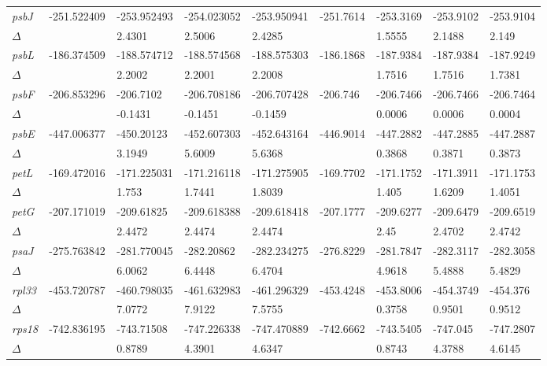 \documentclass[a4paper]{article}
\begin{document}
\begin{longtable}{p{0.03\linewidth}|p{0.095\linewidth}p{0.095\linewidth}p{0.095\linewidth}p{0.095\linewidth}|p{0.095\linewidth}p{0.095\linewidth}p{0.095\linewidth}p{0.095\linewidth}}
 \rowcolor{black!20} \textit{psbJ} & -251.522409 & -253.952493 & -254.023052 & -253.950941 & -251.7614 & -253.3169 & -253.9102 & -253.9104\\
 \rowcolor{black!20} $\Delta$ &  & 2.4301 & 2.5006 & 2.4285 &  & 1.5555 & 2.1488 & 2.149\\
\textit{psbL} & -186.374509 & -188.574712 & -188.574568 & -188.575303 & -186.1868 & -187.9384 & -187.9384 & -187.9249\\
$\Delta$ &  & 2.2002 & 2.2001 & 2.2008 &  & 1.7516 & 1.7516 & 1.7381\\
 \rowcolor{black!20} \textit{psbF} & -206.853296 & -206.7102 & -206.708186 & -206.707428 & -206.746 & -206.7466 & -206.7466 & -206.7464\\
 \rowcolor{black!20} $\Delta$ &  & -0.1431 & -0.1451 & -0.1459 &  & 0.0006 & 0.0006 & 0.0004\\
\textit{psbE} & -447.006377 & -450.20123 & -452.607303 & -452.643164 & -446.9014 & -447.2882 & -447.2885 & -447.2887\\
$\Delta$ &  & 3.1949 & 5.6009 & 5.6368 &  & 0.3868 & 0.3871 & 0.3873\\
 \rowcolor{black!20} \textit{petL} & -169.472016 & -171.225031 & -171.216118 & -171.275905 & -169.7702 & -171.1752 & -171.3911 & -171.1753\\
 \rowcolor{black!20} $\Delta$ &  & 1.753 & 1.7441 & 1.8039 &  & 1.405 & 1.6209 & 1.4051\\
\textit{petG} & -207.171019 & -209.61825 & -209.618388 & -209.618418 & -207.1777 & -209.6277 & -209.6479 & -209.6519\\
$\Delta$ &  & 2.4472 & 2.4474 & 2.4474 &  & 2.45 & 2.4702 & 2.4742\\
 \rowcolor{black!20} \textit{psaJ} & -275.763842 & -281.770045 & -282.20862 & -282.234275 & -276.8229 & -281.7847 & -282.3117 & -282.3058\\
 \rowcolor{black!20} $\Delta$ &  & 6.0062 & 6.4448 & 6.4704 &  & 4.9618 & 5.4888 & 5.4829\\
\textit{rpl33} & -453.720787 & -460.798035 & -461.632983 & -461.296329 & -453.4248 & -453.8006 & -454.3749 & -454.376\\
$\Delta$ &  & 7.0772 & 7.9122 & 7.5755 &  & 0.3758 & 0.9501 & 0.9512\\
 \rowcolor{black!20} \textit{rps18} & -742.836195 & -743.71508 & -747.226338 & -747.470889 & -742.6662 & -743.5405 & -747.045 & -747.2807\\
 \rowcolor{black!20} $\Delta$ &  & 0.8789 & 4.3901 & 4.6347 &  & 0.8743 & 4.3788 & 4.6145\\

\end{longtable}
\end{document}
